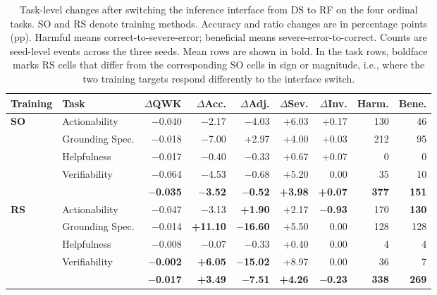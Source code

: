 \begin{table}[t]
\centering
\normalsize
\setlength{\tabcolsep}{2.6pt}
\begin{tabular}{llrrrrrrr}
\toprule
Training & Task & $\Delta$QWK & $\Delta$Acc. & $\Delta$Adj. & $\Delta$Sev. & $\Delta$Inv. & Harm. & Bene. \\
\midrule
\multirow{5}{*}{\textbf{SO}}
 & Actionability         & $-$0.040 & $-$2.17 & $-$4.03 & +6.03 & +0.17 & 130 & 46 \\
 & Grounding Spec.       & $-$0.018 & $-$7.00 & +2.97  & +4.00 & +0.03 & 212 & 95 \\
 & Helpfulness           & $-$0.017 & $-$0.40 & $-$0.33 & +0.67 & +0.07 & 0   & 0 \\
 & Verifiability         & $-$0.064 & $-$4.53 & $-$0.68 & +5.20 & 0.00  & 35  & 10 \\
\cmidrule(l){2-9}
 \textbf{Mean}         &       & \textbf{$-$0.035} & \textbf{$-$3.52} & \textbf{$-$0.52} & \textbf{+3.98} & \textbf{+0.07} & \textbf{377} & \textbf{151} \\
\midrule
\multirow{5}{*}{\textbf{RS}}
 & Actionability         & $-$0.047 & $-$3.13 & \textbf{+1.90} & +2.17 & \textbf{$-$0.93} & 170 & \textbf{130} \\
 & Grounding Spec.       & $-$0.014 & \textbf{+11.10} & \textbf{$-$16.60} & +5.50 & 0.00 & 128 & 128 \\
 & Helpfulness           & $-$0.008 & $-$0.07 & $-$0.33 & +0.40 & 0.00  & 4   & 4 \\
 & Verifiability         & \textbf{$-$0.002} & \textbf{+6.05} & \textbf{$-$15.02} & +8.97 & 0.00 & 36 & 7 \\
\cmidrule(l){2-9}
 \textbf{Mean}         &       & \textbf{$-$0.017} & \textbf{+3.49} & \textbf{$-$7.51} & \textbf{+4.26} & \textbf{$-$0.23} & \textbf{338} & \textbf{269} \\
\bottomrule
\end{tabular}
\caption{Task-level changes after switching the inference interface from DS to RF on the four ordinal tasks. SO and RS denote training methods. Accuracy and ratio changes are in percentage points (pp). Harmful means correct-to-severe-error; beneficial means severe-error-to-correct. Counts are seed-level events across the three seeds. Mean rows are shown in bold. In the task rows, boldface marks RS cells that differ from the corresponding SO cells in sign or magnitude, i.e., where the two training targets respond differently to the interface switch.}
\label{tab:full-interface-transitions}
\end{table}

